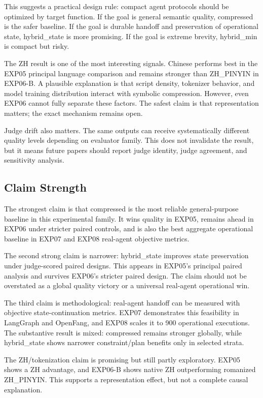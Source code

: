 \documentclass[11pt]{article}
\begin{document}
This suggests a practical design rule: compact agent protocols should be optimized by target function. If the goal is general semantic quality, compressed is the safer baseline. If the goal is durable handoff and preservation of operational state, hybrid\_state is more promising. If the goal is extreme brevity, hybrid\_min is compact but risky.

The ZH result is one of the most interesting signals. Chinese performs best in the EXP05 principal language comparison and remains stronger than ZH\_PINYIN in EXP06-B. A plausible explanation is that script density, tokenizer behavior, and model training distribution interact with symbolic compression. However, even EXP06 cannot fully separate these factors. The safest claim is that representation matters; the exact mechanism remains open.

Judge drift also matters. The same outputs can receive systematically different quality levels depending on evaluator family. This does not invalidate the result, but it means future papers should report judge identity, judge agreement, and sensitivity analysis.

\subsection{Claim Strength}
The strongest claim is that compressed is the most reliable general-purpose baseline in this experimental family. It wins quality in EXP05, remains ahead in EXP06 under stricter paired controls, and is also the best aggregate operational baseline in EXP07 and EXP08 real-agent objective metrics.

The second strong claim is narrower: hybrid\_state improves state preservation under judge-scored paired designs. This appears in EXP05's principal paired analysis and survives EXP06's stricter paired design. The claim should not be overstated as a global quality victory or a universal real-agent operational win.

The third claim is methodological: real-agent handoff can be measured with objective state-continuation metrics. EXP07 demonstrates this feasibility in LangGraph and OpenFang, and EXP08 scales it to 900 operational executions. The substantive result is mixed: compressed remains stronger globally, while hybrid\_state shows narrower constraint/plan benefits only in selected strata.

The ZH/tokenization claim is promising but still partly exploratory. EXP05 shows a ZH advantage, and EXP06-B shows native ZH outperforming romanized ZH\_PINYIN. This supports a representation effect, but not a complete causal explanation.
\end{document}
